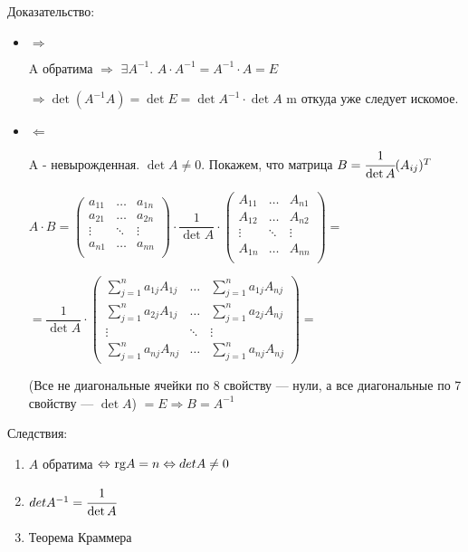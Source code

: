 Доказательство:
\begin{itemize}
\item \(\Rightarrow\) 

A обратима \(\Rightarrow\) \(\exists  A^{-1}\). \( A \cdot    A^{-1}  =  A^{-1} \cdot A = E \) 

\(\Rightarrow \det( A^{-1} A) =\det E = \det A^{-1} \cdot \det A \) m откуда уже следует искомое.

\item \(\Leftarrow\)

A - невырожденная. \(\det A \neq 0 \). Покажем, что матрица  \(B=\cfrac{1}{\det A} (A_{ij})^T\)



\(A \cdot B = \begin{pmatrix}
    a_{11} & \ldots & a_{1n} \\
    a_{21} & \ldots & a_{2n} \\
    \vdots & \ddots & \vdots \\
    a_{n1} & \ldots & a_{nn} \\
\end{pmatrix} \cdot 
\dfrac{1}{\det A} \cdot \begin{pmatrix}
    A_{11} & \ldots & A_{n1} \\
    A_{12} & \ldots & A_{n2} \\
    \vdots & \ddots & \vdots \\
    A_{1n} & \ldots & A_{nn} \\
\end{pmatrix} = \)

\(= \dfrac{1}{\det A} \cdot 
\begin{pmatrix}
    \sum\limits_{j = 1}^{n} a_{1j} A_{1j} & \ldots & \sum\limits_{j = 1}^{n} a_{1j} A_{nj} \\
    \sum\limits_{j = 1}^{n} a_{2j} A_{1j} & \ldots & \sum\limits_{j = 1}^{n} a_{2j} A_{nj} \\
    \vdots & \ddots & \vdots \\
    \sum\limits_{j = 1}^{n} a_{nj} A_{nj} & \ldots & \sum\limits_{j = 1}^{n} a_{nj} A_{nj}
\end{pmatrix} =\) 

(Все не диагональные ячейки по 8 свойству --- нули, а все диагональные по 7 свойству --- \(\det A\)) \(= E \Rightarrow B = A^{-1}\)
\end{itemize}

Следствия:
\begin{enumerate}
    \item \(A\) обратима \(\Leftrightarrow \rg A = n \Leftrightarrow det A \neq 0\)
    
    \item \(det A^{-1} = \cfrac{1}{\det A }\)
    
    \item Теорема Краммера
\end{enumerate}


